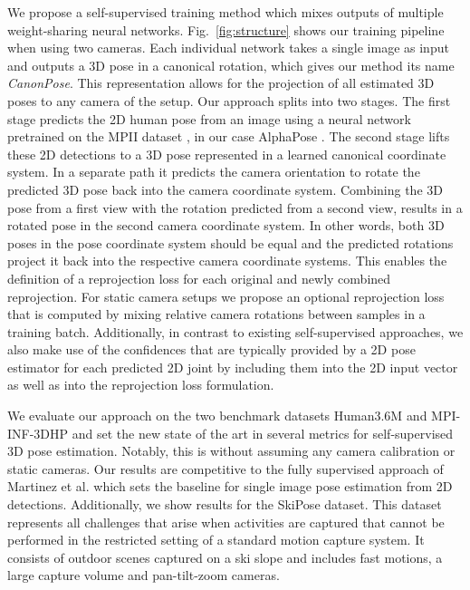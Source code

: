 \documentclass[final]{cvpr}
\begin{document}
We propose a self-supervised training method which mixes outputs of multiple weight-sharing neural networks.
Fig.~\ref{fig:structure} shows our training pipeline when using two cameras.
Each individual network takes a single image as input and outputs a 3D pose in a canonical rotation, which gives our method its name \emph{CanonPose}.
This representation allows for the projection of all estimated 3D poses to any camera of the setup. 
Our approach splits into two stages.
The first stage predicts the 2D human pose from an image using a neural network pretrained on the MPII dataset \cite{mpii3Dhp2017}, in our case AlphaPose \cite{fang2017rmpe_alphapose,li2018crowdpose_alphapose}.
The second stage lifts these 2D detections to a 3D pose represented in a learned canonical coordinate system.
In a separate path it predicts the camera orientation to rotate the predicted 3D pose back into the camera coordinate system.
Combining the 3D pose from a first view with the rotation predicted from a second view, results in a rotated pose in the second camera coordinate system.
In other words, both 3D poses in the pose coordinate system should be equal and the predicted rotations project it back into the respective camera coordinate systems.
This enables the definition of a reprojection loss for each original and newly combined reprojection.
For static camera setups we propose an optional reprojection loss that is computed by mixing relative camera rotations between samples in a training batch.
Additionally, in contrast to existing self-supervised approaches, we also make use of the confidences that are typically provided by a 2D pose estimator for each predicted 2D joint by including them into the 2D input vector as well as into the reprojection loss formulation.

We evaluate our approach on the two benchmark datasets Human3.6M \cite{h36m_pami} and MPI-INF-3DHP \cite{mpii3Dhp2017} and set the new state of the art in several metrics for self-supervised 3D pose estimation.
Notably, this is without assuming any camera calibration or static cameras.
Our results are competitive to the fully supervised approach of Martinez et al. \cite{martinez_2017_3Dbaseline} which sets the baseline for single image pose estimation from 2D detections.
Additionally, we show results for the SkiPose \cite{sporri2016reasearch_skipose,rhodin2018learning} dataset.
This dataset represents all challenges that arise when activities are captured that cannot be performed in the restricted setting of a standard motion capture system.
It consists of outdoor scenes captured on a ski slope and includes fast motions, a large capture volume and pan-tilt-zoom cameras.
\end{document}
